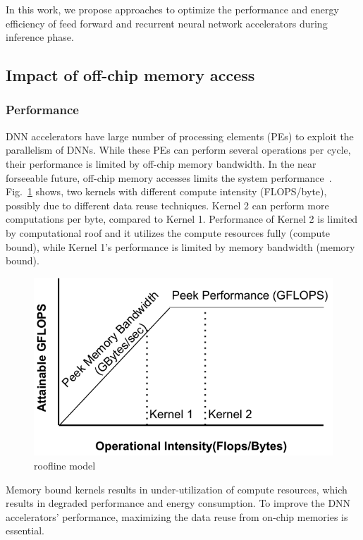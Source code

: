 \documentclass[a4paper,10pt]{article}
\begin{document}
In this work, we propose approaches to optimize the performance and energy efficiency of feed forward and recurrent neural network accelerators during inference phase.

\subsection{Impact of off-chip memory access}
\subsubsection{Performance}
DNN accelerators have large number of processing elements (PEs) to exploit the parallelism of DNNs. While these PEs can perform several operations per cycle, their performance is limited by off-chip memory bandwidth. In the near forseeable future, off-chip memory accesses limits the system performance~\cite{williams2009roofline}. Fig.~\ref{fig:roofline} shows, two kernels with different compute intensity (FLOPS/byte), possibly due to different data reuse techniques. Kernel 2 can perform more computations per byte, compared to Kernel 1. Performance of Kernel 2 is limited by computational roof and it utilizes the compute resources fully (compute bound), while Kernel 1's performance is limited by memory bandwidth (memory bound).
\begin{figure}[!htb]
	\centering
	\includegraphics[width=0.5\linewidth]{roofline}
	\caption{roofline model}
	\label{fig:roofline}
\end{figure}
Memory bound kernels results in under-utilization of compute resources, which results in degraded performance and energy consumption. To improve the DNN accelerators' performance, maximizing the data reuse from on-chip memories is essential.
\end{document}
